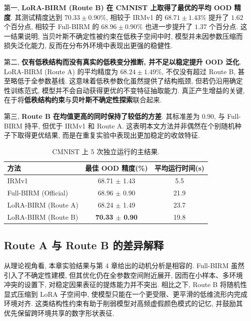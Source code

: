 \documentclass[a4paper,punct=banjiao,twoside]{ctexrep}
\theoremstyle{plain}
\theoremstyle{definition}
\theoremstyle{remark}
\begin{document}
第一, \textbf{LoRA-BIRM (Route B) 在 CMNIST 上取得了最优的平均 OOD 精度}. 其测试精度达到 $70.33 \pm 0.90\%$, 相较于 IRMv1 的 $68.71 \pm 1.43\%$ 提升了 $1.62$ 个百分点, 相较于 Full-BIRM 的 $68.96 \pm 0.90\%$ 也进一步提升了 $1.37$ 个百分点. 这一结果说明, 当贝叶斯不确定性被约束在低秩子空间中时, 模型并未因参数压缩而损失泛化能力, 反而在分布外环境中表现出更强的稳健性.

第二, \textbf{仅有低秩结构而没有真实的低秩变分推断, 并不足以稳定提升 OOD 泛化}. LoRA-BIRM (Route A) 的平均精度为 $68.24 \pm 1.49\%$, 不仅没有超过 Route B, 甚至略低于全参数基线. 这意味着低秩参数化虽然提供了结构瓶颈, 但若仍沿用确定性训练范式, 模型并不会自动获得更优的不变特征抽取能力. 真正产生增益的关键, 在于将\textbf{低秩结构约束}与\textbf{贝叶斯不确定性探索}联合起来.

第三, \textbf{Route B 在均值更高的同时保持了较低的方差}. 其标准差为 $0.90$, 与 Full-BIRM 持平, 但优于 IRMv1 和 Route A. 这表明本文方法并非偶然在个别随机种子下取得更优结果, 而是在重复实验中表现出更加稳定的收敛特征.

\begin{table}[htbp]
    \centering
    \caption{CMNIST 上 5 次独立运行的主结果.}
    \label{tab:cmnist_main_results}
    \begin{tabular}{lcc}
        \toprule
        方法 & 最佳 OOD 精度(\%) & 平均运行时间(s) \\
        \midrule
        IRMv1 & 68.71 $\pm$ 1.43 & 5.5 \\
        Full-BIRM (Official) & 68.96 $\pm$ 0.90 & 21.9 \\
        LoRA-BIRM (Route A) & 68.24 $\pm$ 1.49 & 23.7 \\
        LoRA-BIRM (Route B) & \textbf{70.33 $\pm$ 0.90} & 19.8 \\
        \bottomrule
    \end{tabular}
\end{table}

\subsection{Route A 与 Route B 的差异解释}
从理论视角看, 本章实验结果与第 4 章给出的动机分析是相容的. Full-BIRM 虽然引入了不确定性建模, 但其优化仍在全参数空间附近展开, 因而在小样本、多环境冲突的设置下, 对稳定因果表征的提炼能力并不突出. 相比之下, Route B 将随机性显式压缩到 LoRA 子空间中, 使模型只能在一个更受限、更平滑的低维流形内完成环境对齐. 这类结构性约束有助于削弱模型对高频虚假颜色模式的记忆, 并鼓励其优先保留跨环境共享的数字形状表征.
\end{document}
